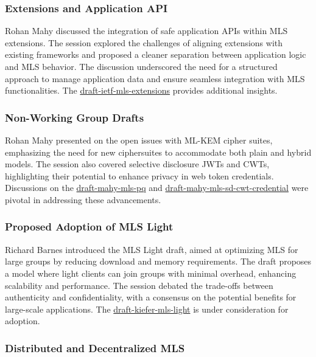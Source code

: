 \documentclass{article}
\begin{document}
\subsubsection{Extensions and Application API}

Rohan Mahy discussed the integration of safe application APIs within MLS extensions. The session explored the challenges of aligning extensions with existing frameworks and proposed a cleaner separation between application logic and MLS behavior. The discussion underscored the need for a structured approach to manage application data and ensure seamless integration with MLS functionalities. The \href{https://datatracker.ietf.org/doc/html/draft-ietf-mls-extensions}{draft-ietf-mls-extensions} provides additional insights.

\subsubsection{Non-Working Group Drafts}

Rohan Mahy presented on the open issues with ML-KEM cipher suites, emphasizing the need for new ciphersuites to accommodate both plain and hybrid models. The session also covered selective disclosure JWTs and CWTs, highlighting their potential to enhance privacy in web token credentials. Discussions on the \href{https://datatracker.ietf.org/doc/html/draft-mahy-mls-pq}{draft-mahy-mls-pq} and \href{https://datatracker.ietf.org/doc/html/draft-mahy-mls-sd-cwt-credential}{draft-mahy-mls-sd-cwt-credential} were pivotal in addressing these advancements.

\subsubsection{Proposed Adoption of MLS Light}

Richard Barnes introduced the MLS Light draft, aimed at optimizing MLS for large groups by reducing download and memory requirements. The draft proposes a model where light clients can join groups with minimal overhead, enhancing scalability and performance. The session debated the trade-offs between authenticity and confidentiality, with a consensus on the potential benefits for large-scale applications. The \href{https://datatracker.ietf.org/doc/html/draft-kiefer-mls-light}{draft-kiefer-mls-light} is under consideration for adoption.

\subsubsection{Distributed and Decentralized MLS}
\end{document}
